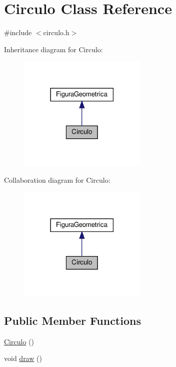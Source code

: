 \hypertarget{class_circulo}{}\section{Circulo Class Reference}
\label{class_circulo}


{\ttfamily \#include $<$circulo.\+h$>$}



Inheritance diagram for Circulo\+:
\nopagebreak
\begin{figure}[H]
\begin{center}
\leavevmode
\includegraphics[width=174pt]{class_circulo__inherit__graph}
\end{center}
\end{figure}


Collaboration diagram for Circulo\+:
\nopagebreak
\begin{figure}[H]
\begin{center}
\leavevmode
\includegraphics[width=174pt]{class_circulo__coll__graph}
\end{center}
\end{figure}
\subsection*{Public Member Functions}
\begin{DoxyCompactItemize}
\item 
\hyperlink{class_circulo_a6933bf908b78a4167684081a3a8f257f}{Circulo} ()
\item 
void \hyperlink{class_circulo_aa94899872fb6c586d1343df1d9ce0d86}{draw} ()
\end{DoxyCompactItemize}


